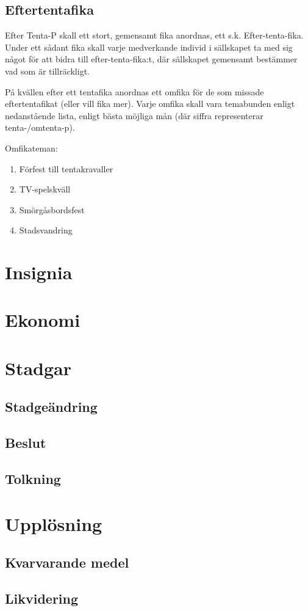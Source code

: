 \documentclass{article}
\begin{document}
\subsection{Eftertentafika}
Efter Tenta-P skall ett stort, gemensamt fika anordnas, ett s.k.
Efter-tenta-fika. Under ett sådant fika skall varje medverkande individ i
sällskapet ta med sig något för att bidra till efter-tenta-fika:t, där
sällskapet gemensamt bestämmer vad som är tillräckligt.

På kvällen efter ett tentafika anordnas ett omfika för de som missade
eftertentafikat (eller vill fika mer). Varje omfika skall vara temabunden enligt
nedanstående lista, enligt bästa möjliga mån (där siffra representerar
tenta-/omtenta-p).

Omfikateman:
\begin{enumerate}
  \item Förfest till tentakravaller
  \item TV-spelskväll
  \item Smörgåsbordsfest
  \item Stadsvandring
\end{enumerate}

\section{Insignia}

\section{Ekonomi}

\section{Stadgar}
\subsection{Stadgeändring}
\subsection{Beslut}
\subsection{Tolkning}

\section{Upplösning}
\subsection{Kvarvarande medel}
\subsection{Likvidering}
\end{document}
